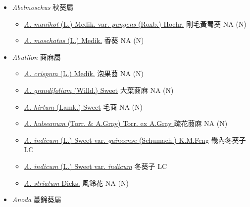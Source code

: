 
  \begin{itemize}
 \item[] \textit{Abelmoschus} 秋葵屬
                                
  \begin{itemize}
        \item[] \href{http://www.theplantlist.org/tpl1.1/search?q=Abelmoschus+manihot+var.+pungens}{\textit{A. manihot} (L.) Medik. var. \textit{pungens} (Roxb.) Hochr.}   剛毛黃蜀葵   NA (N)
        \item[] \href{http://www.theplantlist.org/tpl1.1/search?q=Abelmoschus+moschatus}{\textit{A. moschatus} (L.) Medik.}   香葵   NA (N)
  \end{itemize}
 \item[] \textit{Abutilon} 莔麻屬
                                
  \begin{itemize}
        \item[] \href{http://www.theplantlist.org/tpl1.1/search?q=Abutilon+crispum}{\textit{A. crispum} (L.) Medik.}   泡果莔   NA (N)
        \item[] \href{http://www.theplantlist.org/tpl1.1/search?q=Abutilon+grandifolium}{\textit{A. grandifolium} (Willd.) Sweet}   大葉莔麻   NA (N)
        \item[] \href{http://www.theplantlist.org/tpl1.1/search?q=Abutilon+hirtum}{\textit{A. hirtum} (Lamk.) Sweet}   毛莔   NA (N)
        \item[] \href{http://www.theplantlist.org/tpl1.1/search?q=Abutilon+hulseanum}{\textit{A. hulseanum} (Torr. \& A.Gray) Torr. ex A.Gray }   疏花莔麻   NA (N)
        \item[] \href{http://www.theplantlist.org/tpl1.1/search?q=Abutilon+indicum+var.+guineense}{\textit{A. indicum} (L.) Sweet var. \textit{guineense} (Schumach.) K.M.Feng}   畿內冬葵子   LC
        \item[] \href{http://www.theplantlist.org/tpl1.1/search?q=Abutilon+indicum+var.+indicum}{\textit{A. indicum} (L.) Sweet var. \textit{indicum}}   冬葵子   LC
        \item[] \href{http://www.theplantlist.org/tpl1.1/search?q=Abutilon+striatum}{\textit{A. striatum} Dicks.}   風鈴花   NA (N)
  \end{itemize}
 \item[] \textit{Anoda} 蔓錦葵屬
                                

\end{itemize}
